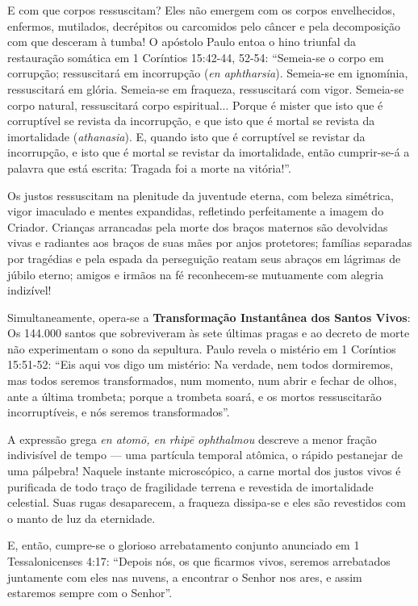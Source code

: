 \documentclass[11pt,a4paper,openany]{book}
\begin{document}
E com que corpos ressuscitam?
Eles não emergem com os corpos envelhecidos, enfermos, mutilados, decrépitos ou carcomidos pelo câncer e pela decomposição com que desceram à tumba!
O apóstolo Paulo entoa o hino triunfal da restauração somática em 1 Coríntios 15:42-44, 52-54:
``Semeia-se o corpo em corrupção; ressuscitará em incorrupção (\textit{en aphtharsia}). Semeia-se em ignomínia, ressuscitará em glória. Semeia-se em fraqueza, ressuscitará com vigor. Semeia-se corpo natural, ressuscitará corpo espiritual... Porque é mister que isto que é corruptível se revista da incorrupção, e que isto que é mortal se revista da imortalidade (\textit{athanasia}). E, quando isto que é corruptível se revistar da incorrupção, e isto que é mortal se revistar da imortalidade, então cumprir-se-á a palavra que está escrita: Tragada foi a morte na vitória!''.

Os justos ressuscitam na plenitude da juventude eterna, com beleza simétrica, vigor imaculado e mentes expandidas, refletindo perfeitamente a imagem do Criador. Crianças arrancadas pela morte dos braços maternos são devolvidas vivas e radiantes aos braços de suas mães por anjos protetores; famílias separadas por tragédias e pela espada da perseguição reatam seus abraços em lágrimas de júbilo eterno; amigos e irmãos na fé reconhecem-se mutuamente com alegria indizível!

Simultaneamente, opera-se a \textbf{Transformação Instantânea dos Santos Vivos}:
Os 144.000 santos que sobreviveram às sete últimas pragas e ao decreto de morte não experimentam o sono da sepultura. Paulo revela o mistério em 1 Coríntios 15:51-52:
``Eis aqui vos digo um mistério: Na verdade, nem todos dormiremos, mas todos seremos transformados, num momento, num abrir e fechar de olhos, ante a última trombeta; porque a trombeta soará, e os mortos ressuscitarão incorruptíveis, e nós seremos transformados''.

A expressão grega \textit{en atomō, en rhipē ophthalmou} descreve a menor fração indivisível de tempo — uma partícula temporal atômica, o rápido pestanejar de uma pálpebra! Naquele instante microscópico, a carne mortal dos justos vivos é purificada de todo traço de fragilidade terrena e revestida de imortalidade celestial. Suas rugas desaparecem, a fraqueza dissipa-se e eles são revestidos com o manto de luz da eternidade.

E, então, cumpre-se o glorioso arrebatamento conjunto anunciado em 1 Tessalonicenses 4:17:
``Depois nós, os que ficarmos vivos, seremos arrebatados juntamente com eles nas nuvens, a encontrar o Senhor nos ares, e assim estaremos sempre com o Senhor''.
\end{document}
